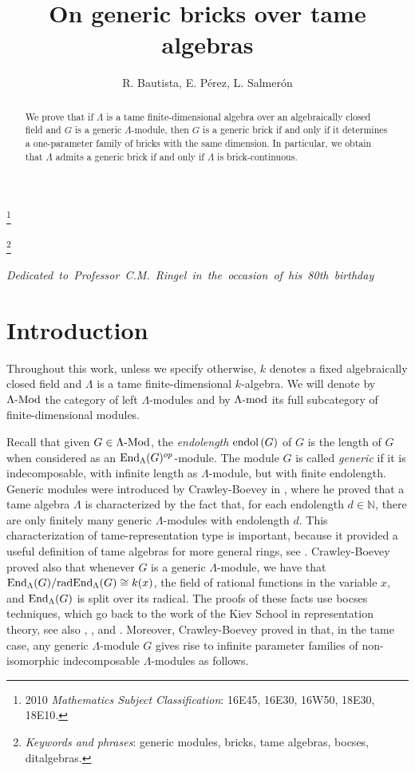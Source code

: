\documentclass{article}
\title{\bf {\Large On generic bricks over tame algebras}}
\author{R. Bautista, E. P\'erez, L. Salmer\'on}
\theoremstyle{definition}
\newcommand{\End}{{ \rm End }}
\newcommand{\Mod}{{ \rm Mod }}
\newcommand{\rad}{{ \rm rad }}
\newcommand{\g}{\hbox{-}}
\newcommand{\Endol}[1]{\hbox{\rm endol}\,(#1)}
\newcommand{\hueca}[1]{\mathbb{#1}}
\renewcommand{\mod}{{\rm mod }}
\begin{document}
 \date{}
 
 \maketitle
  
 \renewcommand{\thefootnote}{}

\footnote{2010 \emph{Mathematics Subject Classification}:
   16E45, 16E30, 16W50, 18E30, 18E10.}

\footnote{\emph{Keywords and phrases}: generic modules, bricks, tame algebras, bocses, ditalgebras.}

\hbox{\emph{Dedicated to Professor C.M. Ringel in the occasion of his 80th birthday}}

  \begin{abstract}
\noindent We prove that if $\Lambda$ is a tame  finite-dimensional  algebra over an algebraically closed field and $G$ is a generic $\Lambda$-module, then $G$ is a generic brick if and only if it determines a one-parameter family of bricks with the same dimension. In particular, we obtain that $\Lambda$ admits a generic brick if and only if $\Lambda$ is brick-continuous.     
\end{abstract}


\section{Introduction}

Throughout this work,  unless we specify  otherwise, $k$ denotes a fixed algebraically closed field and $\Lambda$ is a tame finite-dimensional   $k$-algebra. We will denote by $\Lambda\g\Mod$ the category of left $\Lambda$-modules and by $\Lambda\g\mod$ its full subcategory of finite-dimensional modules. 

Recall that given $G\in \Lambda\g\Mod$, the \emph{endolength} $\Endol{G}$ of $G$ is the length of $G$ when considered as an $\End_{\Lambda}(G)^{op}$-module. The module $G$ is called \emph{generic} if it is indecomposable, with infinite length as $\Lambda$-module, but 
with finite endolength. Generic modules were introduced by Crawley-Boevey in \cite{CB2}, where he proved that a tame algebra $\Lambda$ is characterized by the fact that, for each endolength $d\in\hueca{N}$, there are only finitely many generic $\Lambda$-modules with endolength $d$. This  characterization of tame-representation type is important, because it provided a useful definition of tame algebras for more general rings, see \cite{CB3}. Crawley-Boevey proved also that 
whenever $G$ is a generic $\Lambda$-module, we have  that $\End_\Lambda (G)/\rad \End_\Lambda (G) \cong k(x)$, the field of rational functions in the variable $x$,  and $\End_\Lambda (G)$ is split over its radical. 
The proofs of these facts use bocses techniques, which go back to the work of the Kiev School in representation theory, see also  \cite{R-K}, \cite{D}, and \cite{CB1}. Moreover, Crawley-Boevey
proved in \cite{CB2} that, in the tame case, any generic $\Lambda$-module $G$ gives rise to  infinite parameter families of non-isomorphic indecomposable $\Lambda$-modules  as follows. 
\end{document}
